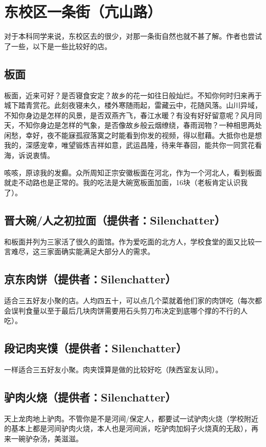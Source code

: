 \documentclass[lang=cn,color=blue,12pt,scheme=chinese,chinesefont=nofont]{elegantbook}
\begin{document}
\section{东校区一条街（亢山路）}
\setlength{\parindent}{2em}
对于本科同学来说，东校区去的很少，对那一条街自然也就不甚了解。作者也尝试了一些，以下是一些比较好的店。

\subsection{板面}
板面，近来可好？是否寝食安定？故乡的花一如往日般灿烂。不知你何时归来再于城下踏青赏花。此刻夜寝未久，楼外寒随雨起，雷藏云中，花随风落。山川异域，不知你身边是怎样的风景，是否双燕齐飞，春江水暖？有没有好好留意呢？风月同天，不知你身边是怎样的气象，是否像故乡般云烟缭绕，春雨润物？一种相思两处闲愁，幸好，夜不能寐孤寂落寞之时能看到你发的视频，得以慰藉。大抵你也是想我的，深感宠幸，唯望锻炼吉祥如意，武运昌隆，待来年春回，能共你一同赏花看海，诉说衷情。

咳咳，原谅我的发癫。众所周知正宗安徽板面在河北，作为一个河北人，看到板面就走不动路也是正常的。我的吃法是大碗宽板面加面，16块（老板肯定认识我了）。

\subsection{晋大碗/人之初拉面（提供者：Silenchatter）}
和板面并列为三家活了很久的面馆。作为爱吃面的北方人，学校食堂的面又比较一言难尽，这三家面确实能满足大部分人的需求。

\subsection{京东肉饼（提供者：Silenchatter）}
适合三五好友小聚的店。人均四五十，可以点几个菜就着他们家的肉饼吃（每次都会误判食量以至于最后几块肉饼需要用石头剪刀布决定到底哪个撑的不行的人吃）。

\subsection{段记肉夹馍（提供者：Silenchatter）}
一样适合三五好友小聚。肉夹馍算是做的比较好吃（陕西室友认同）。

\subsection{驴肉火烧（提供者：Silenchatter）}
天上龙肉地上驴肉。不管你是不是河间/保定人，都要试一试驴肉火烧（学校附近的基本上都是河间驴肉火烧，本人也是河间派，吃驴肉加焖子火烧真的无敌），再来一碗驴杂汤，美滋滋。
\end{document}
